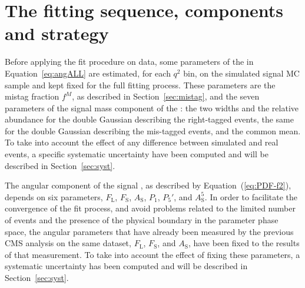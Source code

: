 \section{The fitting sequence, components and strategy}
\label{sec:fitseq}

Before applying the fit procedure on data, some parameters of the \pdf in Equation~\ref{eq:angALL} are estimated, for each $q^2$ bin, on the simulated signal MC sample and kept fixed for the full fitting process.
These parameters are the mistag fraction $f^{M}$, as described in Section~\ref{sec:mistag}, and the seven parameters of the signal mass component of the \pdf: the two widths and the relative abundance for the double Gaussian describing the right-tagged events, the same for the double Gaussian describing the mis-tagged events, and the common mean.
To take into account the effect of any difference between simulated and real events, a specific systematic uncertainty have been computed and will be described in Section~\ref{sec:syst}.

The angular component of the signal \pdf, as described by Equation~(\ref{eq:PDF-f2}), depends on six  parameters, $F_\mathrm{L}$, $F_\mathrm{S}$, $A_\mathrm{S}$, $P_1$, $P_5'$, and $A^5_\mathrm{S}$.
In order to facilitate the convergence of the fit process, and avoid problems related to the limited number of events and the presence of the physical boundary in the parameter phase space, the angular parameters that have already been measured by the previous CMS analysis on the same dataset, $F_\mathrm{L}$, $F_\mathrm{S}$, and $A_\mathrm{S}$, have been fixed to the results of that measurement.
To take into account the effect of fixing these parameters, a systematic uncertainty has been computed and will be described in Section~\ref{sec:syst}.


